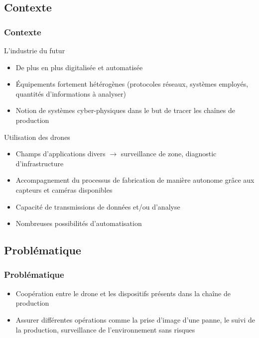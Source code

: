 \documentclass[12pt]{beamer}
\begin{document}
	\subsection{Contexte}	
	\begin{frame}[allowframebreaks]
	\frametitle{Contexte}
		\begin{exampleblock}{L'industrie du futur}
				\begin{itemize}
					[cercle]
					\item De plus en plus digitalisée et automatisée
					\item Équipements fortement hétérogènes (protocoles réseaux, systèmes employés, quantités d'informations à analyser)
					\item Notion de systèmes cyber-physiques dans le but de tracer les chaînes de production
				\end{itemize}
		\end{exampleblock}
		
		\begin{exampleblock}{Utilisation des drones}
				\begin{itemize}
					[cercle]
					\item Champs d'applications divers $\rightarrow$ surveillance de zone, diagnostic d'infrastructure
					\item Accompagnement du processus de fabrication de manière autonome grâce aux capteurs et caméras disponibles
					\item Capacité de transmissions de données et/ou d'analyse
					\item Nombreuses possibilités d'automatisation
				\end{itemize}
		\end{exampleblock}
	\end{frame}
	
	\subsection{Problématique}	
	\begin{frame}
	\frametitle{Problématique}
		\begin{exampleblock}{}
			\begin{itemize}
				[triangle]
				\item Coopération entre le drone et les dispositifs présents dans la chaîne de production
				\item Assurer différentes opérations comme la prise d'image d'une panne, le suivi de la production, surveillance de l'environnement sans risques
			\end{itemize}
		\end{exampleblock}
	\end{frame}
	
\end{document}
